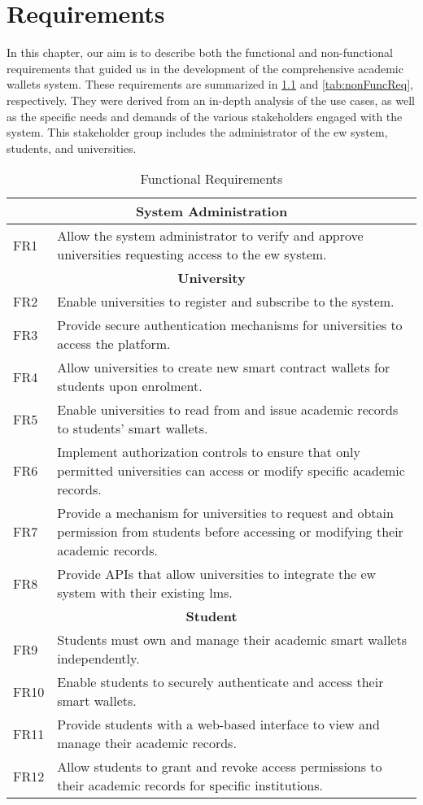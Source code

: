 \chapter{Requirements}
\label{chap:requirements}
In this chapter, our aim is to describe both the functional and non-functional requirements that guided us in the development of the comprehensive academic wallets system. These requirements are summarized in \cref{tab:funcReq} and \cref{tab:nonFuncReq}, respectively. They were derived from an in-depth analysis of the use cases, as well as the specific needs and demands of the various stakeholders engaged with the system. This stakeholder group includes the administrator of the \acrfull{ew} system, students, and universities.

\begin{table}[htpb]
\centering
\caption{Functional Requirements}
\label{tab:funcReq}
\begin{tabular}{|p{1.0cm}|p{11cm}|}
\hline
\multicolumn{2}{|c|}{\textbf{System Administration}} \\
\hline
FR1 & Allow the system administrator to verify and approve universities requesting access to the \acrlong{ew} system. \\
\hline
\multicolumn{2}{|c|}{\textbf{University}} \\
\hline
FR2 & Enable universities to register and subscribe to the system. \\
FR3 & Provide secure authentication mechanisms for universities to access the platform. \\
FR4 & Allow universities to create new smart contract wallets for students upon enrolment. \\
FR5 & Enable universities to read from and issue academic records to students' smart wallets. \\
FR6 & Implement authorization controls to ensure that only permitted universities can access or modify specific academic records. \\
FR7 & Provide a mechanism for universities to request and obtain permission from students before accessing or modifying their academic records. \\
FR8 & Provide APIs that allow universities to integrate the \acrlong{ew} system with their existing \acrlong{lms}. \\
\hline
\multicolumn{2}{|c|}{\textbf{Student}} \\
\hline
FR9  & Students must own and manage their academic smart wallets independently. \\
FR10 & Enable students to securely authenticate and access their smart wallets. \\
FR11 & Provide students with a web-based interface to view and manage their academic records. \\
FR12 & Allow students to grant and revoke access permissions to their academic records for specific institutions. \\
\hline
\end{tabular}
\end{table}
